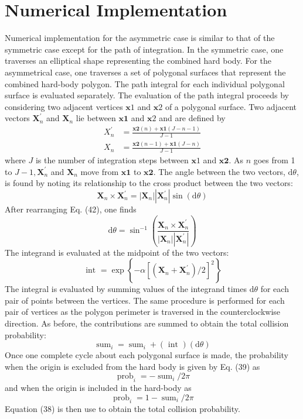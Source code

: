 \documentclass[10pt]{article}
\begin{document}
\section{Numerical Implementation}
Numerical implementation for the asymmetric case is similar to that of the symmetric case except for the path of integration. In the symmetric case, one traverses an elliptical shape representing the combined hard body. For the asymmetrical case, one traverses a set of polygonal surfaces that represent the combined hard-body polygon. The path integral for each individual polygonal surface is evaluated separately. The evaluation of the path integral proceeds by considering two adjacent vertices $\boldsymbol{x} 1$ and $\boldsymbol{x} 2$ of a polygonal surface. Two adjacent vectors $\boldsymbol{X}_{n}^{\prime}$ and $\boldsymbol{X}_{n}$ lie between $\boldsymbol{x} \mathbf{1}$ and $\boldsymbol{x} 2$ and are defined by
$$
\begin{aligned}
X_{n}^{\prime} &=\frac{\boldsymbol{x 2}(n)+\boldsymbol{x} \mathbf{1}(J-n-1)}{J-1} \\
X_{n} &=\frac{\boldsymbol{x 2}(n-1)+\boldsymbol{x} \mathbf{1}(J-n)}{J-1}
\end{aligned}
$$
where $J$ is the number of integration steps between $\boldsymbol{x} 1$ and $\boldsymbol{x} \mathbf{2}$. As $n$ goes from 1 to $J-1, \boldsymbol{X}_{n}^{\prime}$ and $\boldsymbol{X}_{n}$ move from $\boldsymbol{x} \mathbf{1}$ to $\boldsymbol{x} \mathbf{2}$. The angle between the two vectors, $\mathrm{d} \theta$, is found by noting its relationship to the cross product between the two vectors:
$$
\boldsymbol{X}_{n} \times \boldsymbol{X}_{n}^{\prime}=\left|\boldsymbol{X}_{n}\right|\left|\boldsymbol{X}_{n}^{\prime}\right| \sin (\mathrm{d} \theta)
$$
After rearranging Eq. (42), one finds
$$
\mathrm{d} \theta=\sin ^{-1}\left(\frac{\boldsymbol{X}_{n} \times \boldsymbol{X}_{n}^{\prime}}{\left|\boldsymbol{X}_{n}\right|\left|\boldsymbol{X}_{n}^{\prime}\right|}\right)
$$
The integrand is evaluated at the midpoint of the two vectors:
$$
\text { int }=\exp \left\{-\alpha\left[\left(\boldsymbol{X}_{n}+\boldsymbol{X}_{n}^{\prime}\right) / 2\right]^{2}\right\}
$$
The integral is evaluated by summing values of the integrand times $\mathrm{d} \theta$ for each pair of points between the vertices. The same procedure is performed for each pair of vertices as the polygon perimeter is traversed in the counterclockwise direction. As before, the contributions are summed to obtain the total collision probability:
$$
\operatorname{sum}_{i}=\operatorname{sum}_{i}+(\text { int })(\mathrm{d} \theta)
$$
Once one complete cycle about each polygonal surface is made, the probability when the origin is excluded from the hard body is given by Eq. (39) as
$$
\operatorname{prob}_{i}=-\operatorname{sum}_{i} / 2 \pi
$$
and when the origin is included in the hard-body as
$$
\operatorname{prob}_{i}=1-\operatorname{sum}_{i} / 2 \pi
$$
Equation (38) is then use to obtain the total collision probability.
\end{document}
